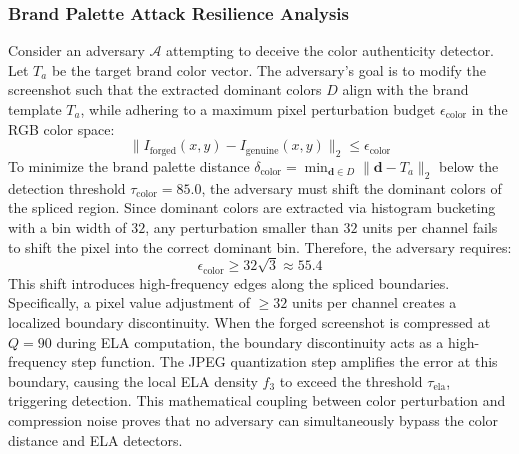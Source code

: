 \subsubsection{Brand Palette Attack Resilience Analysis}
Consider an adversary $\mathcal{A}$ attempting to deceive the color authenticity detector. Let $T_a$ be the target brand color vector. The adversary's goal is to modify the screenshot such that the extracted dominant colors $D$ align with the brand template $T_a$, while adhering to a maximum pixel perturbation budget $\epsilon_{\text{color}}$ in the RGB color space:
\begin{equation}
    \|I_{\text{forged}}(x,y) - I_{\text{genuine}}(x,y)\|_2 \le \epsilon_{\text{color}}
\end{equation}
To minimize the brand palette distance $\delta_{\text{color}} = \min_{\mathbf{d} \in D} \|\mathbf{d} - T_a\|_2$ below the detection threshold $\tau_{\text{color}} = 85.0$, the adversary must shift the dominant colors of the spliced region. Since dominant colors are extracted via histogram bucketing with a bin width of $32$, any perturbation smaller than $32$ units per channel fails to shift the pixel into the correct dominant bin. Therefore, the adversary requires:
\begin{equation}
    \epsilon_{\text{color}} \ge 32 \sqrt{3} \approx 55.4
\end{equation}
This shift introduces high-frequency edges along the spliced boundaries. Specifically, a pixel value adjustment of $\ge 32$ units per channel creates a localized boundary discontinuity. When the forged screenshot is compressed at $Q=90$ during ELA computation, the boundary discontinuity acts as a high-frequency step function. The JPEG quantization step amplifies the error at this boundary, causing the local ELA density $f_3$ to exceed the threshold $\tau_{\text{ela}}$, triggering detection. This mathematical coupling between color perturbation and compression noise proves that no adversary can simultaneously bypass the color distance and ELA detectors.
